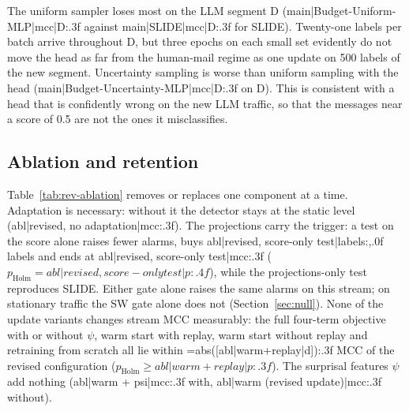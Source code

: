 {{The uniform sampler loses most on the LLM segment D ({{main|Budget-Uniform-MLP|mcc|D:.3f}} against {{main|SLIDE|mcc|D:.3f}} for SLIDE). Twenty-one labels per batch arrive throughout D, but three epochs on each small set evidently do not move the head as far from the human-mail regime as one update on 500 labels of the new segment. Uncertainty sampling is worse than uniform sampling with the head ({{main|Budget-Uncertainty-MLP|mcc|D:.3f}} on D). This is consistent with a head that is confidently wrong on the new LLM traffic, so that the messages near a score of 0.5 are not the ones it misclassifies.

\subsection{Ablation and retention}\label{sec:ablation}
Table~\ref{tab:rev-ablation} removes or replaces one component at a time. Adaptation is necessary: without it the detector stays at the static level ({{abl|revised, no adaptation|mcc:.3f}}). The projections carry the trigger: a test on the score alone raises fewer alarms, buys {{abl|revised, score-only test|labels:,.0f}} labels and ends at {{abl|revised, score-only test|mcc:.3f}} ($p_{\mathrm{Holm}}={{abl|revised, score-only test|p:.4f}}$), while the projections-only test reproduces SLIDE. Either gate alone raises the same alarms on this stream; on stationary traffic the SW gate alone does not (Section~\ref{sec:null}). None of the update variants changes stream MCC measurably: the full four-term objective with or without $\psi$, warm start with replay, warm start without replay and retraining from scratch all lie within {{=abs([abl|warm+replay|d]):.3f}} MCC of the revised configuration ($p_{\mathrm{Holm}}\geq{{abl|warm+replay|p:.3f}}$). The surprisal features $\psi$ add nothing ({{abl|warm + psi|mcc:.3f}} with, {{abl|warm (revised update)|mcc:.3f}} without).



}}
